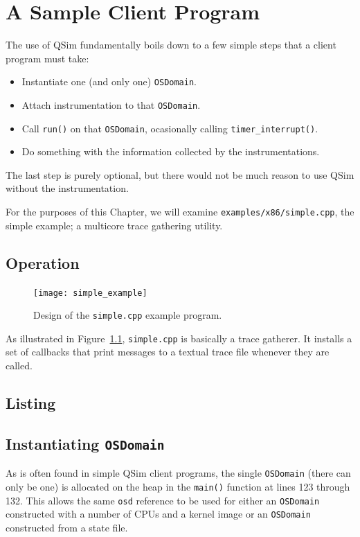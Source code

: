 \documentclass[letterpaper, 10pt]{book}
\begin{document}
\chapter{A Sample Client Program} \label{chap:example}
The use of QSim fundamentally boils down to a few simple steps that a client
program must take:
\begin{itemize}
  \item{Instantiate one (and only one) \texttt{OSDomain}.}
  \item{Attach instrumentation to that \texttt{OSDomain}.}
  \item{Call \texttt{run()} on that \texttt{OSDomain}, ocasionally calling
        \texttt{timer\_interrupt()}.} 
  \item{Do something with the information collected by the instrumentations.}
\end{itemize}

The last step is purely optional, but there would not be much reason to use
QSim without the instrumentation.

For the purposes of this Chapter, we will examine \texttt{examples/x86/simple.cpp},
the simple example; a multicore trace gathering utility.

\section{Operation}

\begin{figure}
\begin{center}
\texttt{[image: simple\_example]}
\caption{Design of the \texttt{simple.cpp} example program.}
\label{fig:simplecpp}
\end{center}
\end{figure}

As illustrated in Figure~\ref{fig:simplecpp}, \texttt{simple.cpp} is basically a
trace gatherer. It installs a set of callbacks that print messages to a textual
trace file whenever they are called.

\section{Listing}


\section{Instantiating \texttt{OSDomain}}
As is often found in simple QSim client programs, the single \texttt{OSDomain}
(there can only be one) is allocated on the heap in the \texttt{main()}
function at lines 123 through 132. This allows the same \texttt{osd} reference
to be used for either an \texttt{OSDomain} constructed with a number of CPUs and
a kernel image or an \texttt{OSDomain} constructed from a state file.
\end{document}
